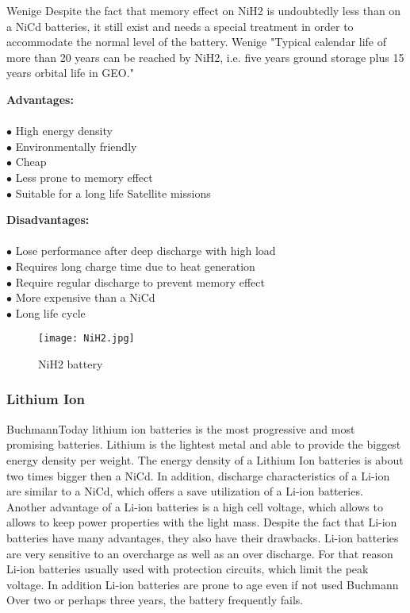 Wenige\cite{8} Despite the fact that memory effect on NiH2 is undoubtedly less than on a NiCd batteries, it still exist and needs a special treatment in order to accommodate the normal level of the battery. Wenige\cite{8} "Typical calendar life of more than 20 years can be reached by NiH2, i.e. five years ground storage plus 15  years  orbital  life  in  GEO." 


\begin{multicols}{2}
	
	\textbf{Advantages:} \\ \\
	$\bullet$ High energy density\\
	$\bullet$ Environmentally friendly\\
	$\bullet$ Cheap\\
	$\bullet$ Less prone to memory effect\\
	$\bullet$ Suitable for a long life Satellite missions\\
	

	
	
	\columnbreak
	
	\textbf{Disadvantages:} \\ \\
	$\bullet$ Lose performance after deep discharge with high load\\
	$\bullet$ Requires long charge time due to heat generation\\
	$\bullet$ Require regular discharge to prevent memory effect\\ 
	$\bullet$ More expensive than a NiCd\\
	$\bullet$ Long life cycle

	
\end{multicols}

\begin{figure}[h]
	\centering
	\texttt{[image: NiH2.jpg]}
	\caption{ NiH2 battery \cite{10}}
	\label{fig: EPS}
\end{figure}

\subsubsection{Lithium Ion \label{sec:tech}}

Buchmann\cite{7}Today lithium ion batteries is the most progressive and most promising batteries. Lithium is the lightest metal and able to provide the biggest energy density per weight. The energy density of a Lithium Ion batteries is about two times bigger then a NiCd. In addition, discharge characteristics of a Li-ion are similar to a NiCd, which offers a save utilization of a Li-ion batteries. Another advantage of a Li-ion batteries is a high cell voltage, which allows to allows to keep power properties with the light mass. Despite the fact that Li-ion batteries have many advantages, they also have their drawbacks. Li-ion batteries are very sensitive to an overcharge as well as an over discharge. For that reason Li-ion batteries usually used with protection circuits, which limit the peak voltage. In addition Li-ion batteries are prone to age even if not used Buchmann\cite{7} Over two or perhaps three years, the battery frequently fails.


